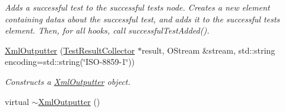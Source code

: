 \begin{DoxyCompactItemize}
\begin{DoxyCompactList}\small\item\em Adds a successful test to the successful tests node. Creates a new element containing datas about the successful test, and adds it to the successful tests element. Then, for all hooks, call successful\+Test\+Added(). \end{DoxyCompactList}\item 
\hyperlink{class_xml_outputter_af98780d86b93b9eb2aa440c752d5ed6f}{Xml\+Outputter} (\hyperlink{class_test_result_collector}{Test\+Result\+Collector} $\ast$result, O\+Stream \&stream, std\+::string encoding=std\+::string(\char`\"{}I\+S\+O-\/8859-\/1\char`\"{}))
\begin{DoxyCompactList}\small\item\em Constructs a \hyperlink{class_xml_outputter}{Xml\+Outputter} object. \end{DoxyCompactList}\item 
\hypertarget{class_xml_outputter_a159ce827427e235d8f2db9719acbba94}{virtual \hyperlink{class_xml_outputter_a159ce827427e235d8f2db9719acbba94}{$\sim$\+Xml\+Outputter} ()}\label{class_xml_outputter_a159ce827427e235d8f2db9719acbba94}


\end{DoxyCompactItemize}
